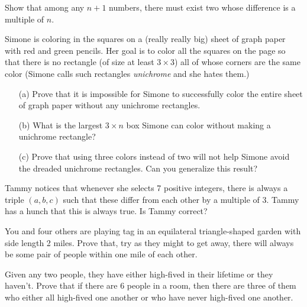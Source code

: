 \documentclass[12pt]{article}
\begin{document}
        \begin{exercise}
            Show that among any $n+1$ numbers, there must exist two whose difference is a multiple of $n$.
        \end{exercise}

        \begin{exercise}
            Simone is coloring in the squares on a (really really big) sheet of graph paper with red and green pencils. 
            Her goal is to color all the squares on the page so that there is no rectangle (of size at least \(3\times 3\)) all of whose corners are the same color (Simone calls such rectangles \textit{unichrome} and she hates them.) 
            \begin{enumerate}
                \item[(a)] Prove that it is impossible for Simone to successfully color the entire sheet of graph paper without any unichrome rectangles.
                \item[(b)] What is the largest \(3\times n\) box Simone can color without making a unichrome rectangle?
                \item[(c)] Prove that using three colors instead of two will not help Simone avoid the dreaded unichrome rectangles.
                Can you generalize this result?
            \end{enumerate}
        \end{exercise}

        \begin{exercise}
            Tammy notices that whenever she selects 7 positive integers, there is always a triple \((a,b,c)\) such that these differ from each other by a multiple of 3.
            Tammy has a hunch that this is always true. 
            Is Tammy correct?
        \end{exercise}

        \begin{exercise}
            You and four others are playing tag in an equilateral triangle-shaped garden with side length 2 miles.
            Prove that, try as they might to get away, there will always be some pair of people within one mile of each other.
        \end{exercise}

        \begin{exercise}
            Given any two people, they have either high-fived in their lifetime or they haven't.
            Prove that if there are 6 people in a room, then there are three of them who either all high-fived one another or who have never high-fived one another.
        \end{exercise}
\end{document}
